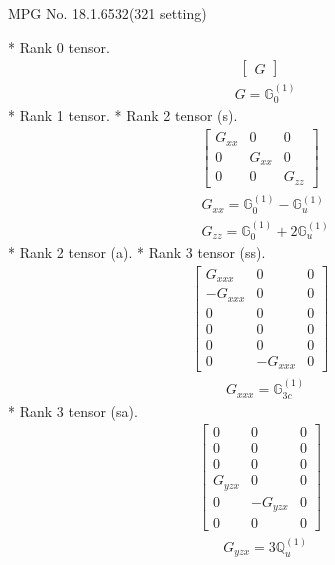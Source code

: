 \documentclass[fleqn,8pt,landscape]{jsarticle}
\begin{document}
\setcounter{MaxMatrixCols}{32}

\renewcommand{\tablename}{Table~}
\renewcommand{\figurename}{Figure~}
\begin{center}
\LARGE
MPG No. 18.1.65\quad$32$\quad(321 setting)
\end{center}
* Rank 0 tensor.
\begin{align*}
\begin{bmatrix} G \end{bmatrix}
\end{align*}
\begin{align*}
& G = \mathbb{G}_{0}^{(1)}
\end{align*}
* Rank 1 tensor.
* Rank 2 tensor (s).
\begin{align*}
\begin{bmatrix} G_{xx} & 0 & 0 \\ 0 & G_{xx} & 0 \\ 0 & 0 & G_{zz} \end{bmatrix}
\end{align*}
\begin{align*}
& G_{xx} = \mathbb{G}_{0}^{(1)} - \mathbb{G}_{u}^{(1)} \\
& G_{zz} = \mathbb{G}_{0}^{(1)} + 2 \mathbb{G}_{u}^{(1)}
\end{align*}
* Rank 2 tensor (a).
* Rank 3 tensor (ss).
\begin{align*}
\begin{bmatrix} G_{xxx} & 0 & 0 \\ - G_{xxx} & 0 & 0 \\ 0 & 0 & 0 \\ 0 & 0 & 0 \\ 0 & 0 & 0 \\ 0 & - G_{xxx} & 0 \end{bmatrix}
\end{align*}
\begin{align*}
& G_{xxx} = \mathbb{G}_{3c}^{(1)}
\end{align*}
* Rank 3 tensor (sa).
\begin{align*}
\begin{bmatrix} 0 & 0 & 0 \\ 0 & 0 & 0 \\ 0 & 0 & 0 \\ G_{yzx} & 0 & 0 \\ 0 & - G_{yzx} & 0 \\ 0 & 0 & 0 \end{bmatrix}
\end{align*}
\begin{align*}
& G_{yzx} = 3 \mathbb{Q}_{u}^{(1)}
\end{align*}
\end{document}
